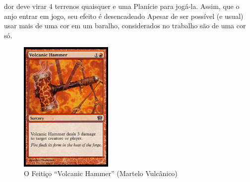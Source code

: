 dor deve virar 4 terrenos quaisquer e uma Planície para jogá-la. Assim, que o anjo entrar em jogo, seu efeito é desencadeado Apesar de ser possível (e usual) usar mais de uma cor em um baralho, considerados no trabalho são de uma cor só.

\begin{figure}[!h]
  \centering
  \includegraphics[width=0.4\textwidth]{picstcc/volcanicfull.png}
  \caption{O Feitiço ``Volcanic Hammer'' (Martelo Vulcânico)}
  \label{volcanicsorcery}
\end{figure}

